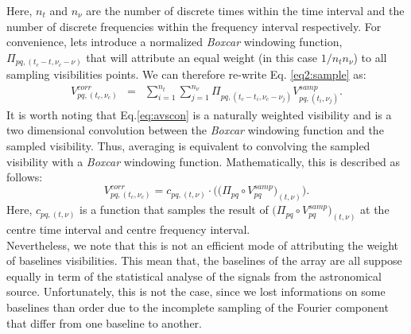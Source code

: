 \documentclass[useAMS,usenatbib]{mn2e}
\begin{document}
Here, $n_t$ and $n_{\nu}$ are the number of discrete times within the time interval  and the number of discrete frequencies 
within the frequency interval  respectively. For convenience, lets introduce a normalized \textit{Boxcar} windowing 
function, $\Pi_{pq,(t_c - t,\nu_c -\nu)}$  that will attribute an equal weight (in this case $1/n_t n_{\nu}$) to all sampling visibilities 
points. We can therefore re-write Eq. \ref{eq2:sample} as:
\begin{eqnarray}
V_{pq,(t_c,\nu_c)}^{corr}&=&\sum_{i=1}^{n_t}\sum_{j=1}^{n_{\nu}}\Pi_{pq,(t_c - t_i,\nu_c -\nu_j)}V_{pq,(t_i,\nu_j)}^{samp}. 
\label{eq:avscon}
\end{eqnarray}
It is worth noting that Eq.\ref{eq:avscon} is a naturally weighted visibility and is a two dimensional convolution between the 
\textit{Boxcar} windowing function and the sampled visibility. Thus, averaging is equivalent to convolving the 
sampled 
visibility with a \textit{Boxcar} windowing function. Mathematically, this is described as follows:
\begin{equation}
 V_{pq,(t_c,\nu_c)}^{corr}=c_{pq,(t,\nu)}\cdot\Bigg(\Big(\Pi_{pq}\circ V_{pq}^{samp}\Big)_{(t,\nu)}\Bigg). \label{f4}
\end{equation}
Here, $c_{pq,(t,\nu)}$ is a function that samples the result of $\Big(\Pi_{pq}\circ V_{pq}^{samp}\Big)_{(t,\nu)}$ at 
the centre time interval and centre frequency interval. 
\\%
Nevertheless, we note that this is not an efficient mode of attributing the weight of baselines visibilities. This mean that, the baselines 
of the array are all suppose equally in term of the statistical analyse of the signals from the astronomical source. Unfortunately, this 
is not the case, since we lost informations on some baselines than order due to the incomplete sampling of the Fourier component that 
differ from one baseline to another.
\end{document}

